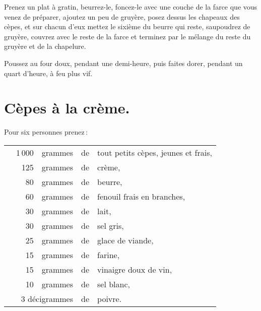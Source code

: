 Prenez un plat à gratin, beurrez-le, foncez-le avec une couche de la farce que
vous venez de préparer, ajoutez un peu de gruyère, posez dessus les chapeaux
des cèpes, et sur chacun d'eux mettez le sixième du beurre qui reste,
saupoudrez de gruyère, couvrez avec le reste de la farce et terminez par le
mélange du reste du gruyère et de la chapelure.

Poussez au four doux, pendant une demi-heure, puis faites dorer, pendant un
quart d'heure, à feu plus vif.

\section*{\centering Cèpes à la crème.}
{}

Pour six personnes prenez :

\footnotesize
\begin{longtable}{rrrrp{16em}}
  &   1 000 & grammes & de & tout petits cèpes, jeunes et frais,                                          \\
  &     125 & grammes & de & crème,                                                                       \\
  &      80 & grammes & de & beurre,                                                                      \\
  &      60 & grammes & de & fenouil frais en branches,                                                   \\
  &      30 & grammes & de & lait,                                                                        \\
  &      30 & grammes & de & sel gris,                                                                    \\
  &      25 & grammes & de & glace de viande,                                                             \\
  &      15 & grammes & de & farine,                                                                      \\
  &      15 & grammes & de & vinaigre doux de vin,                                                        \\
  &      10 & grammes & de & sel blanc,                                                                   \\
  & \multicolumn{2}{r}{3 décigrammes} & de & poivre.                                                      \\
\end{longtable}
\normalsize

